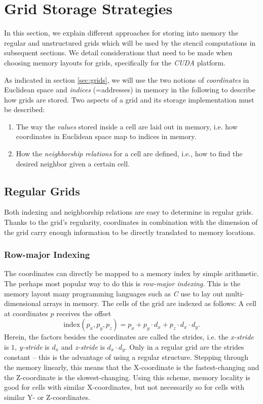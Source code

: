 \chapter{Grid Storage Strategies}                \label{sec:grid-implementations}

In this section, we explain different approaches for storing into memory the regular and unstructured grids which will be used by the stencil computations in subsequent sections. We detail considerations that need to be made when choosing memory layouts for grids, specifically for the \emph{CUDA} platform.

As indicated in section \ref{sec:grids}, we will use the two notions of \emph{coordinates} in Euclidean space and \emph{indices} (=addresses) in memory in the following to describe how grids are stored. Two aspects of a grid and its storage implementation must be described:
\begin{enumerate}
    \item The way the \emph{values} stored inside a cell are laid out in memory, i.e. how coordinates in Euclidean space map to indices in memory.
    \item How the \emph{neighborship relations} for a cell are defined, i.e., how to find the desired neighbor given a certain cell.
\end{enumerate}

\section{Regular Grids}

Both indexing and neighborship relations are easy to determine in regular grids. Thanks to the grid's regularity, coordinates in combination with the dimension of the grid carry enough information to be directly translated to memory locations.

\subsection{Row-major Indexing}

The coordinates can directly be mapped to a memory index by simple arithmetic. The perhaps most popular way to do this is \emph{row-major indexing}. This is the memory layout many programming languages such as \emph{C} use to lay out multi-dimensional arrays in memory. The cells of the grid are indexed as follows: A cell at coordinates $p$ receives the offset
 $$\text{index}\left(p_x, p_y, p_z\right) = p_x + p_y \cdot d_x + p_z \cdot d_x \cdot d_y.$$
Herein, the factors besides the coordinates are called the strides, i.e. the \emph{x-stride} is $1$, \emph{y-stride} is $d_x$ and \emph{z-stride} is $d_x\cdot d_y$. Only in a regular grid are the strides constant -- this is the advantage of using a regular structure. Stepping through the memory linearly, this means that the X-coordinate is the fastest-changing and the Z-coordinate is the slowest-changing. Using this scheme, memory locality is good for cells with similar X-coordinates, but not necessarily so for cells with similar Y- or Z-coordinates.

